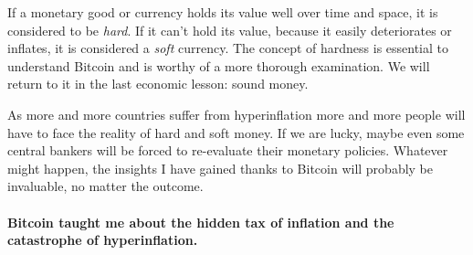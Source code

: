 If a monetary good or currency holds its value well over time and space,
it is considered to be \textit{hard}. If it can't hold its value, because it
easily deteriorates or inflates, it is considered a \textit{soft} currency. The
concept of hardness is essential to understand Bitcoin and is worthy of
a more thorough examination. We will return to it in the last economic
lesson: sound money.

As more and more countries suffer from
hyperinflation more and more people will have to face the reality
of hard and soft money. If we are lucky, maybe even some central bankers will be
forced to re-evaluate their monetary policies. Whatever might happen, the
insights I have gained thanks to Bitcoin will probably be invaluable, no matter
the outcome.

\paragraph{Bitcoin taught me about the hidden tax of inflation and the catastrophe
of hyperinflation.}

%
%
%
%
%
